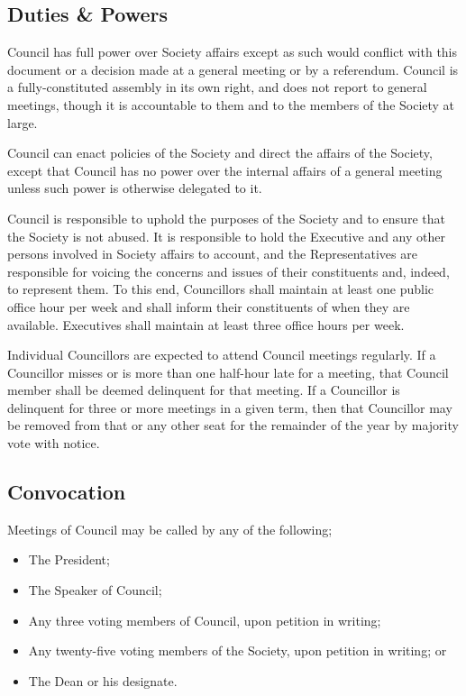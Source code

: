 \subsection{Duties \& Powers}
Council has full power over Society affairs except as such would conflict with
this document or a decision made at a general meeting or by a referendum.
Council is a fully-constituted assembly in its own right, and does not report to
general meetings, though it is accountable to them and to the members of the
Society at large.

Council can enact policies of the Society and direct the affairs of the Society,
except that Council has no power over the internal affairs of a general meeting
unless such power is otherwise delegated to it.

Council is responsible to uphold the purposes of the Society and to ensure that
the Society is not abused. It is responsible to hold the Executive and any other
persons involved in Society affairs to account, and the Representatives are
responsible for voicing the concerns and issues of their constituents and,
indeed, to represent them. To this end, Councillors shall maintain at least one
public office hour per week and shall inform their constituents of when they are
available. Executives shall maintain at least three office hours per week.

Individual Councillors are expected to attend Council meetings regularly. If a
Councillor misses or is more than one half-hour late for a meeting, that Council
member shall be deemed delinquent for that meeting. If a Councillor is
delinquent for three or more meetings in a given term, then that Councillor may
be removed from that or any other seat for the remainder of the year by majority
vote with notice.

\subsection{Convocation}
Meetings of Council may be called by any of the following;
\begin{itemize}
  \item The President;
  \item The Speaker of Council;
  \item Any three voting members of Council, upon petition in writing;
  \item Any twenty-five voting members of the Society, upon petition in writing;
    or
  \item The Dean or his designate.
\end{itemize}

